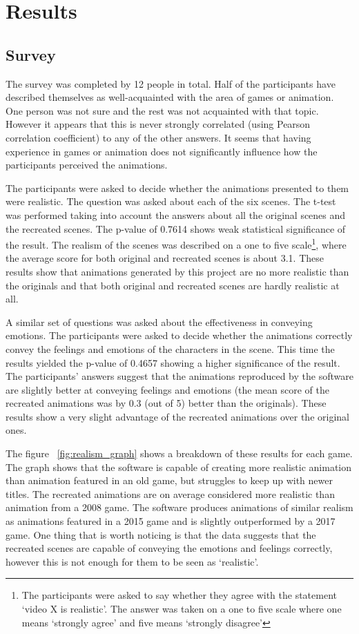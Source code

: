 \chapter{Results \label{chap:results}}

\section{Survey}
The survey was completed by 12 people in total. Half of the participants have described themselves as well-acquainted with the area of games or animation. One person was not sure and the rest was not acquainted with that topic. However it appears that this is never strongly correlated (using Pearson correlation coefficient) to any of the other answers. It seems that having experience in games or animation does not significantly influence how the participants perceived the animations.

The participants were asked to decide whether the animations presented to them were realistic. The question was asked about each of the six scenes. The t-test was performed taking into account the answers about all the original scenes and the recreated scenes. The p-value of 0.7614 shows weak statistical significance of the result. The realism of the scenes was described on a one to five scale\footnote{The participants were asked to say whether they agree with the statement  `video X is realistic'. The answer was taken on a one to five scale where one means `strongly agree' and five means `strongly disagree'}, where the average score for both original and recreated scenes is about 3.1. These results show that animations generated by this project are no more realistic than the originals and that both original and recreated scenes are hardly realistic at all.
	
A similar set of questions was asked about the effectiveness in conveying emotions. The participants were asked to decide whether the animations correctly convey the feelings and emotions of the characters in the scene. This time the results yielded the p-value of 0.4657 showing a higher significance of the result. The participants' answers suggest that the animations reproduced by the software are slightly better at conveying feelings and emotions (the mean score of the recreated animations was by 0.3 (out of 5) better than the originals). These results show a very slight advantage of the recreated animations over the original ones.

The figure ~\ref{fig:realism_graph} shows a breakdown of these results for each game. The graph shows that the software is capable of creating more realistic animation than animation featured in an old game, but struggles to keep up with newer titles. The recreated animations are on average considered more realistic than animation from a 2008 game. The software produces animations of similar realism as animations featured in a 2015 game and is slightly outperformed by a 2017 game. One thing that is worth noticing is that the data suggests that the recreated scenes are capable of conveying the emotions and feelings correctly, however this is not enough for them to be seen as `realistic'.

